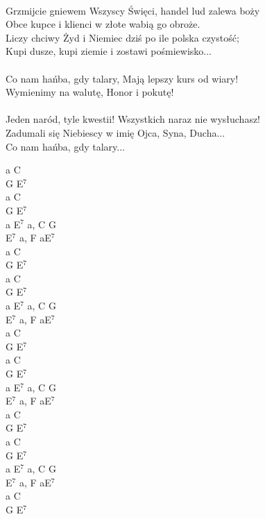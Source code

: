 \documentclass[a5paper, 10pt]{book}
\begin{document}
\begin{minipage}[t]{0.82\textwidth}
\\
Grzmijcie gniewem Wszyscy Święci, handel lud zalewa boży\\
Obce kupce i klienci w złote wabią go obroże.\\
Liczy chciwy Żyd i Niemiec dziś po ile polska czystość;\\
Kupi dusze, kupi ziemie i zostawi pośmiewisko...\\
\\
\hspace*{3mm}Co nam hańba, gdy talary, Mają lepszy kurs od wiary!\\
\hspace*{3mm}Wymienimy na walutę, Honor i pokutę!\\
\\
Jeden naród, tyle kwestii! Wszystkich naraz nie wysłuchasz!\\
Zadumali się Niebiescy w imię Ojca, Syna, Ducha...\\
Co nam hańba, gdy talary...\\
\end{minipage}
\begin{minipage}[t]{0.25\textwidth}
a C\\
G E$^7$\\
a C\\
G E$^7$\\

a E$^7$ a, C G\\
E$^7$ a, F aE$^7$\\

a C\\
G E$^7$\\
a C\\
G E$^7$\\

a E$^7$ a, C G\\
E$^7$ a, F aE$^7$\\

a C\\
G E$^7$\\
a C\\
G E$^7$\\

a E$^7$ a, C G\\
E$^7$ a, F aE$^7$\\

a C\\
G E$^7$\\
a C\\
G E$^7$\\

a E$^7$ a, C G\\
E$^7$ a, F aE$^7$\\

a C\\
G E$^7$\\
\end{minipage}
\end{document}
